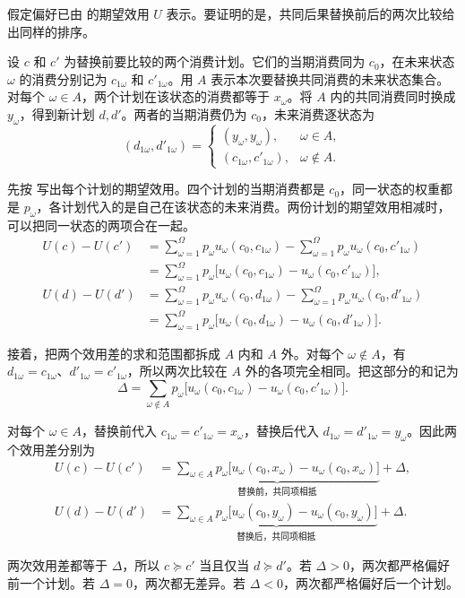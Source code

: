 \begin{solution}[label-content={证明},blank-type=none]
假定偏好已由 的期望效用 $U$ 表示。要证明的是，共同后果替换前后的两次比较给出同样的排序。

设 $c$ 和 $c'$ 为替换前要比较的两个消费计划。它们的当期消费同为 $c_0$，在未来状态 $\omega$ 的消费分别记为 $c_{1\omega}$ 和 $c'_{1\omega}$。用 $A$ 表示本次要替换共同消费的未来状态集合。对每个 $\omega\in A$，两个计划在该状态的消费都等于 $x_\omega$。将 $A$ 内的共同消费同时换成 $y_\omega$，得到新计划 $d,d'$。两者的当期消费仍为 $c_0$，未来消费逐状态为
\[
 (d_{1\omega},d'_{1\omega})=
 \begin{cases}
 (y_\omega,y_\omega),&\omega\in A,\\
 (c_{1\omega},c'_{1\omega}),&\omega\notin A.
 \end{cases}
\]

先按 写出每个计划的期望效用。四个计划的当期消费都是 $c_0$，同一状态的权重都是 $p_\omega$，各计划代入的是自己在该状态的未来消费。两份计划的期望效用相减时，可以把同一状态的两项合在一起。
\[
 \begin{aligned}
 U(c)-U(c')
 &=\sum_{\omega=1}^{\Omega}p_\omega u_\omega(c_0,c_{1\omega})
   -\sum_{\omega=1}^{\Omega}p_\omega u_\omega(c_0,c'_{1\omega})\\
 &=\sum_{\omega=1}^{\Omega}p_\omega
   \bigl[u_\omega(c_0,c_{1\omega})-u_\omega(c_0,c'_{1\omega})\bigr],\\[3pt]
 U(d)-U(d')
 &=\sum_{\omega=1}^{\Omega}p_\omega u_\omega(c_0,d_{1\omega})
   -\sum_{\omega=1}^{\Omega}p_\omega u_\omega(c_0,d'_{1\omega})\\
 &=\sum_{\omega=1}^{\Omega}p_\omega
   \bigl[u_\omega(c_0,d_{1\omega})-u_\omega(c_0,d'_{1\omega})\bigr].
 \end{aligned}
\]

接着，把两个效用差的求和范围都拆成 $A$ 内和 $A$ 外。对每个 $\omega\notin A$，有 $d_{1\omega}=c_{1\omega}$、$d'_{1\omega}=c'_{1\omega}$，所以两次比较在 $A$ 外的各项完全相同。把这部分的和记为
\[
 \Delta=\sum_{\omega\notin A}p_\omega
 \bigl[u_\omega(c_0,c_{1\omega})-u_\omega(c_0,c'_{1\omega})\bigr].
\]

对每个 $\omega\in A$，替换前代入 $c_{1\omega}=c'_{1\omega}=x_\omega$，替换后代入 $d_{1\omega}=d'_{1\omega}=y_\omega$。因此两个效用差分别为
\[
 \begin{aligned}
 U(c)-U(c')&=\underbrace{\sum_{\omega\in A}p_\omega
 \bigl[u_\omega(c_0,x_\omega)-u_\omega(c_0,x_\omega)\bigr]}_{\text{替换前，共同项相抵}}
 +\Delta,\\
 U(d)-U(d')&=\underbrace{\sum_{\omega\in A}p_\omega
 \bigl[u_\omega(c_0,y_\omega)-u_\omega(c_0,y_\omega)\bigr]}_{\text{替换后，共同项相抵}}
 +\Delta.
 \end{aligned}
\]

两次效用差都等于 $\Delta$，所以 $c\succeq c'$ 当且仅当 $d\succeq d'$。若 $\Delta>0$，两次都严格偏好前一个计划。若 $\Delta=0$，两次都无差异。若 $\Delta<0$，两次都严格偏好后一个计划。
\end{solution}

